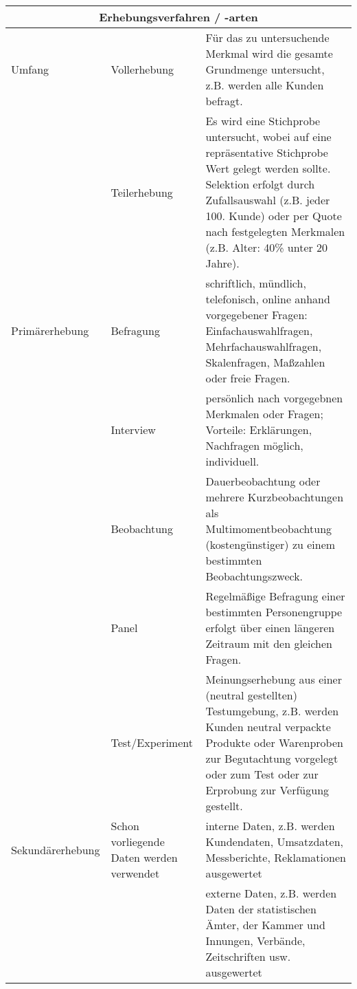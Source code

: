\noindent \begin{tabular}{|p{}|
				 p{}|
				 p{}|} %
\hline
\multicolumn{3}{|c|}{{{\bf{\large Erhebungsverfahren / -arten}}}} \\
\hline
Umfang
& Vollerhebung & Für das zu untersuchende Merkmal wird die gesamte Grundmenge untersucht, z.B. werden alle Kunden befragt. \\
\cline{2-3}
& Teilerhebung & Es wird eine Stichprobe untersucht, wobei auf eine repräsentative Stichprobe Wert gelegt werden sollte. Selektion erfolgt durch Zufallsauswahl (z.B. jeder 100. Kunde) oder per Quote nach festgelegten Merkmalen (z.B. Alter: 40\% unter 20 Jahre). \\
\hline
Primärerhebung
& Befragung & schriftlich, mündlich, telefonisch, online anhand vorgegebener Fragen: Einfachauswahlfragen, Mehrfachauswahlfragen, Skalenfragen, Maßzahlen oder freie Fragen. \\
\cline{2-3}
& Interview & persönlich nach vorgegebnen Merkmalen oder Fragen; Vorteile: Erklärungen, Nachfragen möglich, individuell. \\
\cline{2-3}
& Beobachtung & Dauerbeobachtung oder mehrere Kurzbeobachtungen als Multimomentbeobachtung (kostengünstiger) zu einem bestimmten Beobachtungszweck. \\
\cline{2-3}
& Panel & Regelmäßige Befragung einer bestimmten Personengruppe erfolgt über einen längeren Zeitraum mit den gleichen Fragen. \\
\cline{2-3}
& Test/Experiment & Meinungserhebung aus einer (neutral gestellten) Testumgebung, z.B. werden Kunden neutral verpackte Produkte oder Warenproben zur Begutachtung vorgelegt oder zum Test oder zur Erprobung zur Verfügung gestellt. \\
\hline
Sekundärerhebung & Schon vorliegende Daten werden verwendet
& interne Daten, z.B. werden Kundendaten, Umsatzdaten, Messberichte, Reklamationen ausgewertet \\
\cline{3-3}
& & externe Daten, z.B. werden Daten der statistischen Ämter, der Kammer und Innungen, Verbände, Zeitschriften usw. ausgewertet \\
\hline
\end{tabular}
